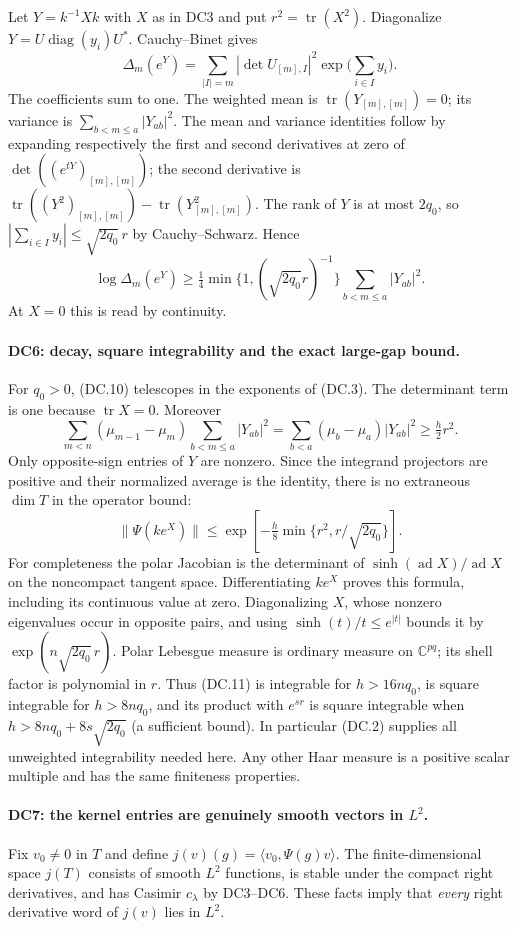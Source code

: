 Let $Y=k^{-1}Xk$ with $X$ as in DC3 and put $r^2=\operatorname{tr}(X^2)$.
Diagonalize $Y=U\operatorname{diag}(y_i)U^*$.  Cauchy--Binet gives
\[
 \Delta_m(e^Y)=\sum_{|I|=m}|\det U_{[m],I}|^2
                              \exp\bigl(\sum_{i\in I}y_i\bigr).
\]
The coefficients sum to one.  The weighted mean is
$\operatorname{tr}(Y_{[m],[m]})=0$; its variance is
$\sum_{b<m\le a}|Y_{ab}|^2$.  The mean and variance identities follow by
expanding respectively the first and second derivatives at zero of
$\det((e^{tY})_{[m],[m]})$; the second derivative is
$\operatorname{tr}((Y^2)_{[m],[m]})-\operatorname{tr}(Y_{[m],[m]}^2)$.
The rank of $Y$ is at most $2q_0$, so
$|\sum_{i\in I}y_i|\le\sqrt{2q_0}\,r$ by Cauchy--Schwarz.  Hence
\[
 \log\Delta_m(e^Y)\ge\tfrac14
  \min\{1,(\sqrt{2q_0}r)^{-1}\}\sum_{b<m\le a}|Y_{ab}|^2.       \tag{DC.10}
\]
At $X=0$ this is read by continuity.

\paragraph{DC6: decay, square integrability and the exact large-gap bound.}
\label{claim:DC6}
For $q_0>0$, (DC.10) telescopes in the exponents of (DC.3).
The determinant term is one because $\operatorname{tr}X=0$.  Moreover
\[
 \sum_{m<n}(\mu_{m-1}-\mu_m)
                 \sum_{b<m\le a}|Y_{ab}|^2
 =\sum_{b<a}(\mu_b-\mu_a)|Y_{ab}|^2\ge\tfrac h2 r^2.
\]
Only opposite-sign entries of $Y$ are nonzero.  Since the integrand
projectors are positive and their normalized average is the identity,
there is no extraneous $\dim T$ in the operator bound:
\[
 \|\Psi(ke^X)\|\le
 \exp\left[-\tfrac h8\min\{r^2,r/\sqrt{2q_0}\}\right].        \tag{DC.11}
\]
For completeness the polar Jacobian is the determinant of
$\sinh(\operatorname{ad}X)/\operatorname{ad}X$ on the noncompact tangent
space.  Differentiating $k e^X$ proves this formula, including its
continuous value at zero.  Diagonalizing $X$, whose nonzero eigenvalues
occur in opposite pairs, and using $\sinh(t)/t\le e^{|t|}$ bounds it by
$\exp(n\sqrt{2q_0}\,r)$.  Polar Lebesgue measure is ordinary measure
on $\mathbb C^{pq}$; its shell factor is polynomial in $r$.
Thus (DC.11) is integrable for $h>16nq_0$, is square integrable for
$h>8nq_0$, and its product with $e^{sr}$ is square integrable when
$h>8nq_0+8s\sqrt{2q_0}$ (a sufficient bound).  In particular (DC.2)
supplies all unweighted integrability needed here.  Any other Haar
measure is a positive scalar multiple and has the same finiteness
properties.

\paragraph{DC7: the kernel entries are genuinely smooth vectors in $L^2$.}
\label{claim:DC7}
Fix $v_0\ne0$ in $T$ and define
$j(v)(g)=\langle v_0,\Psi(g)v\rangle$.
The finite-dimensional space $j(T)$ consists of smooth $L^2$ functions,
is stable under the compact right derivatives, and has Casimir
$c_\lambda$ by DC3--DC6.  These facts imply that \emph{every} right
derivative word of $j(v)$ lies in $L^2$.

